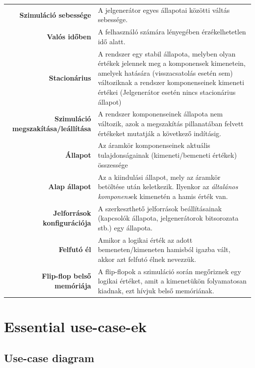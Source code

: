 \begin{longtable}{r p{10.7cm}}
\textbf{Szimuláció sebessége} & A jelgenerátor egyes állapotai közötti váltás sebessége. \\
\textbf{Valós időben} & A felhasználó számára lényegében érzékelhetetlen idő alatt.\\
\textbf{Stacionárius} & A rendszer egy stabil állapota, melyben olyan értékek jelennek meg a komponensek kimenetein, amelyek hatására (visszacsatolás esetén sem) változiknak a rendszer komponenseinek kimeneti értékei (Jelgenerátor esetén nincs stacionárius állapot)\\
\textbf{Szimuláció megszakítása/leállítása} & A rendszer komponenseinek állapota nem változik, azok a megszakítás pillanatában felvett értékeket mutatják a következő indításig.\\
\textbf{Állapot} & Az áramkör komponenseinek aktuális tulajdonságainak (kimeneti/bemeneti értékek) összessége \\
\textbf{Alap állapot} & Az a kiindulási állapot, mely az áramkör betöltése után keletkezik. Ilyenkor az \emph{általános komponens}ek kimenetén a hamis érték van.\\
\textbf{Jelforrások konfigurációja} & A szerkeszthető jelforrások beállításainak (kapcsolók állapota, jelgenerátorok bitsorozata stb.) egy állapota.\\
\textbf{Felfutó él} & Amikor a logikai érték az adott bemeneten/kimeneten hamisból igazba vált, akkor azt felfutó élnek nevezzük.\\
\textbf{Flip-flop belső memóriája} & A flip-flopok a szimuláció során megőriznek egy logikai értéket, amit a kimenetükön folyamatosan kiadnak, ezt hívjuk belső memóriának.
\end{longtable}

\section{Essential use-case-ek}

\subsection{Use-case diagram}
\label{sec:usecasediagram}

